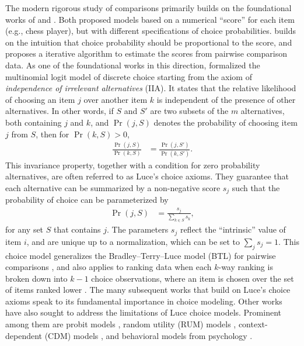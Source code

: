 The modern rigorous study of comparisons primarily builds on the foundational works of \citet{thurstone1927method} and \citet{zermelo1929berechnung}. Both proposed models based on a numerical ``score'' for each item (e.g., chess player), but with different specifications of choice probabilities.
\citet{zermelo1929berechnung} builds on the intuition that choice probability should be proportional to the score, and proposes a iterative algorithm to estimate the scores from pairwise comparison data. As one of the foundational works in this direction, \citet{luce2012individual}
formalized the multinomial logit model
of discrete choice starting from the axiom of \emph{independence of irrelevant alternatives}
(IIA). It states that the relative likelihood of choosing an item
$j$ over another item $k$ is independent of 
the presence of other alternatives. In other words, if $S$ and $S'$ are two subsets of the $m$
alternatives, both containing $j$ and $k$, and $\Pr(j, S)$ denotes
the probability of choosing item $j$ from $S$, then for $\Pr(k, S)>0$,
\begin{align*}
\frac{\Pr(j, S)}{\Pr(k, S)} & =\frac{\Pr(j, S')}{\Pr(k, S')}.
\end{align*}
This invariance property, together with a condition for zero probability alternatives, are often referred to as Luce's choice axioms. They guarantee that each alternative can be summarized
by a non-negative score $s_{j}$ such that the probability of choice can be parameterized by
\begin{align}
\label{eq:Luce}
\Pr(j, S) & =\frac{s_{j}}{\sum_{k\in S}s_{k}},
\end{align}
 for any set $S$ that contains $j$. The parameters $s_{j}$ reflect
the ``intrinsic'' value of item $i$, and are unique up to a normalization,
which can be set to $\sum_{j}s_{j}=1$. This choice model generalizes the Bradley--Terry--Luce model (BTL) for pairwise comparisons \citep{bradley1952rank}, and also applies to ranking data when each $k$-way ranking is broken down into $k-1$ choice observations, where an item is chosen over the set of items ranked lower \citep{critchlow1991probability,plackett1975analysis,hausman1987specifying}. The many subsequent works that build on Luce's choice axioms speak to its fundamental importance in choice modeling. Other works have also sought to address the limitations of Luce choice models. Prominent among them are probit models \citep{thurstone1927method,berkson1944application}, random utility (RUM) models \citep{mcfadden2000mixed}, context-dependent (CDM) models \citep{batsell1985new,seshadri2020learning}, and behavioral models from psychology \citep{tversky1972elimination}.

